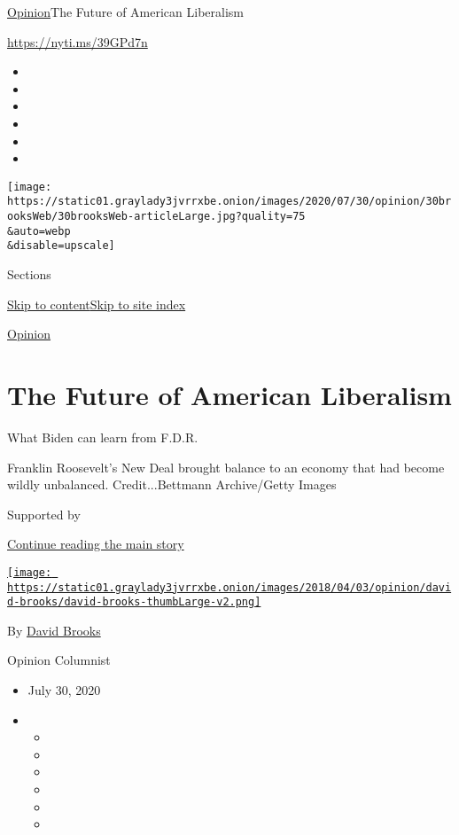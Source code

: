 \href{/section/opinion}{Opinion}\textbar{}The Future of American
Liberalism

\url{https://nyti.ms/39GPd7n}

\begin{itemize}
\item
\item
\item
\item
\item
\item
\end{itemize}

\texttt{[image: https://static01.graylady3jvrrxbe.onion/images/2020/07/30/opinion/30brooksWeb/30brooksWeb-articleLarge.jpg?quality=75\\\&auto=webp\\\&disable=upscale]}

Sections

\protect\hyperlink{site-content}{Skip to
content}\protect\hyperlink{site-index}{Skip to site index}

\href{/section/opinion}{Opinion}

\hypertarget{the-future-of-american-liberalism}{%
\section{The Future of American
Liberalism}\label{the-future-of-american-liberalism}}

What Biden can learn from F.D.R.

Franklin Roosevelt's New Deal brought balance to an economy that had
become wildly unbalanced. Credit...Bettmann Archive/Getty Images

Supported by

\protect\hyperlink{after-sponsor}{Continue reading the main story}

\href{https://www.nytimes3xbfgragh.onion/by/david-brooks}{\texttt{[image: https://static01.graylady3jvrrxbe.onion/images/2018/04/03/opinion/david-brooks/david-brooks-thumbLarge-v2.png]}}

By \href{https://www.nytimes3xbfgragh.onion/by/david-brooks}{David
Brooks}

Opinion Columnist

\begin{itemize}
\item
  July 30, 2020
\item
  \begin{itemize}
  \item
  \item
  \item
  \item
  \item
  \item
  \end{itemize}
\end{itemize}

